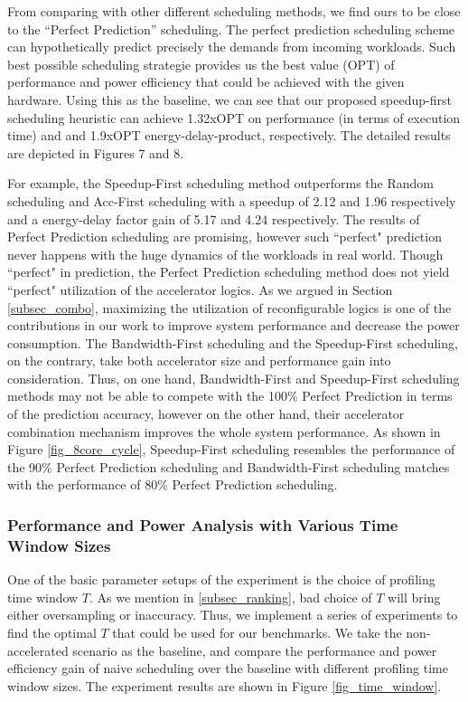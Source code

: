 From comparing with other different scheduling methods, we find ours
to be close to the ``Perfect Prediction'' scheduling. The perfect
prediction scheduling scheme can hypothetically predict precisely
the demands from incoming workloads. Such best possible scheduling
strategie provides us the best value (OPT) of performance and power
efficiency that could be achieved with the given hardware. Using this
as the baseline, we can see that our proposed speedup-first scheduling
heuristic can achieve 1.32xOPT on performance (in terms of execution
time) and and 1.9xOPT energy-delay-product, respectively. The detailed
results are depicted in Figures 7 and 8.  

For example, the Speedup-First scheduling method outperforms the
Random scheduling and Acc-First scheduling with a speedup of 2.12 and
1.96 respectively and a energy-delay factor gain of 5.17 and 4.24
respectively. The results of Perfect Prediction scheduling are
promising, however such ``perfect" prediction never happens with the
huge dynamics of the workloads in real world. Though ``perfect" in
prediction, the Perfect Prediction scheduling method does not yield
``perfect" utilization of the accelerator logics. 
As we argued in Section \ref{subsec_combo}, maximizing the utilization of reconfigurable logics is one of the contributions in our work to improve system performance and decrease the power consumption. The Bandwidth-First scheduling and the Speedup-First scheduling, on the contrary, take both accelerator size and performance gain into consideration. Thus, on one hand, Bandwidth-First and Speedup-First scheduling methods may not be able to compete with the 100\% Perfect Prediction in terms of the prediction accuracy, however on the other hand, their accelerator combination mechanism improves the whole system performance. As shown in Figure \ref{fig_8core_cycle}, Speedup-First scheduling resembles the performance of the 90\% Perfect Prediction scheduling and Bandwidth-First scheduling matches with the performance of 80\% Perfect Prediction scheduling. 
\fi

\subsubsection{Performance and Power Analysis with Various Time Window Sizes}
One of the basic parameter setups of the experiment is the choice of profiling time window $T$. As we mention in \ref{subsec_ranking}, bad choice of $T$ will bring either oversampling or inaccuracy. Thus, we implement a series of experiments to find the optimal $T$ that could be used for our benchmarks. 
We take the non-accelerated scenario as the baseline, and compare the performance and power efficiency gain of naive scheduling over the baseline with different profiling time window sizes. The experiment results are shown in Figure \ref{fig_time_window}.

